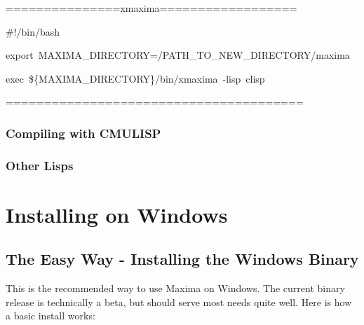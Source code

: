 \vspace{3ex}

===============xmaxima==================

\#!/bin/bash

export~MAXIMA\_DIRECTORY=/PATH\_TO\_NEW\_DIRECTORY/maxima

exec~\$\{MAXIMA\_DIRECTORY\}/bin/xmaxima~-lisp~clisp

=======================================

\vspace{3ex}


\subsubsection{Compiling with CMULISP}


\subsubsection{Other Lisps}


\section{Installing on Windows}


\subsection{The Easy Way - Installing the Windows Binary }

This is the recommended way to use Maxima on Windows. The current
binary release is technically a beta, but should serve most needs
quite well. Here is how a basic install works:

